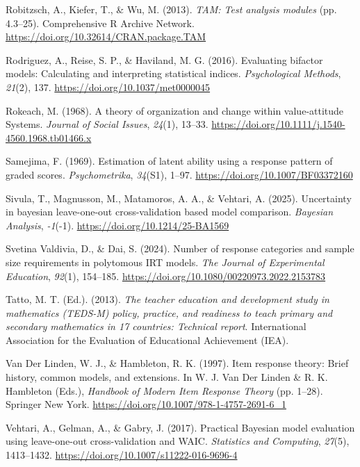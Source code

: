\documentclass[
  man,
  floatsintext,
  longtable,
  nolmodern,
  notxfonts,
  notimes,
  colorlinks=true,linkcolor=blue,citecolor=blue,urlcolor=blue]{apa7}
\newlength{\cslhangindent}
\newenvironment{CSLReferences}[2] %
 {\begin{list}{}{%
  \setlength{\itemindent}{0pt}
  \setlength{\leftmargin}{0pt}
  \setlength{\parsep}{0pt}
  \ifodd #1
   \setlength{\leftmargin}{\cslhangindent}
   \setlength{\itemindent}{-1\cslhangindent}
  \fi
  \setlength{\itemsep}{#2\baselineskip}}}
 {\end{list}}
\begin{document}
\begin{CSLReferences}{1}{0}
Robitzsch, A., Kiefer, T., \& Wu, M. (2013). \emph{{TAM}: Test analysis
modules} (pp. 4.3--25). Comprehensive R Archive Network.
\url{https://doi.org/10.32614/CRAN.package.TAM}

Rodriguez, A., Reise, S. P., \& Haviland, M. G. (2016). Evaluating
bifactor models: {Calculating} and interpreting statistical indices.
\emph{Psychological Methods}, \emph{21}(2), 137.
\url{https://doi.org/10.1037/met0000045}

Rokeach, M. (1968). A theory of organization and change within
value‐attitude {Systems}. \emph{Journal of Social Issues}, \emph{24}(1),
13--33. \url{https://doi.org/10.1111/j.1540-4560.1968.tb01466.x}

Samejima, F. (1969). Estimation of latent ability using a response
pattern of graded scores. \emph{Psychometrika}, \emph{34}(S1), 1--97.
\url{https://doi.org/10.1007/BF03372160}

Sivula, T., Magnusson, M., Matamoros, A. A., \& Vehtari, A. (2025).
Uncertainty in bayesian leave-one-out cross-validation based model
comparison. \emph{Bayesian Analysis}, \emph{-1}(-1).
\url{https://doi.org/10.1214/25-BA1569}

Svetina Valdivia, D., \& Dai, S. (2024). Number of response categories
and sample size requirements in polytomous {IRT} models. \emph{The
Journal of Experimental Education}, \emph{92}(1), 154--185.
\url{https://doi.org/10.1080/00220973.2022.2153783}

Tatto, M. T. (Ed.). (2013). \emph{The teacher education and development
study in mathematics ({TEDS-M}) policy, practice, and readiness to teach
primary and secondary mathematics in 17 countries: Technical report}.
International Association for the Evaluation of Educational Achievement
(IEA).

Van Der Linden, W. J., \& Hambleton, R. K. (1997). Item response theory:
Brief history, common models, and extensions. In W. J. Van Der Linden \&
R. K. Hambleton (Eds.), \emph{Handbook of {Modern Item Response Theory}}
(pp. 1--28). Springer New York.
\url{https://doi.org/10.1007/978-1-4757-2691-6_1}

Vehtari, A., Gelman, A., \& Gabry, J. (2017). Practical {Bayesian} model
evaluation using leave-one-out cross-validation and {WAIC}.
\emph{Statistics and Computing}, \emph{27}(5), 1413--1432.
\url{https://doi.org/10.1007/s11222-016-9696-4}


\end{CSLReferences}
\end{document}
